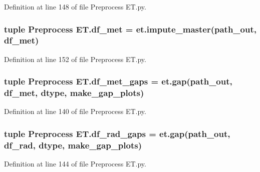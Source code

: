 Definition at line 148 of file Preprocess E\+T.\+py.

\hypertarget{namespace_preprocess_01_e_t_a8b58649c3602d34f2ac3b49109f6a47e}{}
\subsubsection[{df\+\_\+met}]{\setlength{\rightskip}{0pt plus 5cm}tuple Preprocess E\+T.\+df\+\_\+met = et.\+impute\+\_\+master({\bf path\+\_\+out}, df\+\_\+met)}\label{namespace_preprocess_01_e_t_a8b58649c3602d34f2ac3b49109f6a47e}


Definition at line 152 of file Preprocess E\+T.\+py.

\hypertarget{namespace_preprocess_01_e_t_aa7538839fde42801e58678f7e872a8e8}{}
\subsubsection[{df\+\_\+met\+\_\+gaps}]{\setlength{\rightskip}{0pt plus 5cm}tuple Preprocess E\+T.\+df\+\_\+met\+\_\+gaps = et.\+gap({\bf path\+\_\+out}, {\bf df\+\_\+met}, {\bf dtype}, {\bf make\+\_\+gap\+\_\+plots})}\label{namespace_preprocess_01_e_t_aa7538839fde42801e58678f7e872a8e8}


Definition at line 140 of file Preprocess E\+T.\+py.

\hypertarget{namespace_preprocess_01_e_t_a9188c05c2546dabdc999c295871c62f3}{}
\subsubsection[{df\+\_\+rad\+\_\+gaps}]{\setlength{\rightskip}{0pt plus 5cm}tuple Preprocess E\+T.\+df\+\_\+rad\+\_\+gaps = et.\+gap({\bf path\+\_\+out}, df\+\_\+rad, {\bf dtype}, {\bf make\+\_\+gap\+\_\+plots})}\label{namespace_preprocess_01_e_t_a9188c05c2546dabdc999c295871c62f3}


Definition at line 144 of file Preprocess E\+T.\+py.

\hypertarget{namespace_preprocess_01_e_t_a9cd560dc1db09793df2f3871b8831ed9}{}
